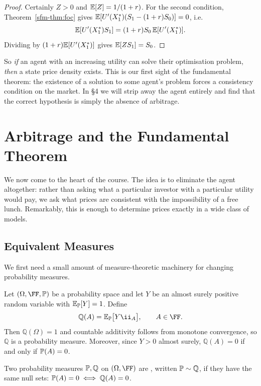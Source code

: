 \documentclass[a4paper]{scrartcl}
\newcommand{\QQ}{\mathbb{Q}}
\begin{document}
\begin{proof}
	Certainly $Z > 0$ and $\mathbb{E}[Z] = 1/(1+r)$. For the second condition, Theorem~\ref{sfm-thm:foc} gives $\mathbb{E}[U'(X_1^*)(S_1 - (1+r)S_0)] = 0$, i.e.
	$$
	\mathbb{E}[U'(X_1^*)S_1] = (1+r)S_0\,\mathbb{E}[U'(X_1^*)].
	$$
	Dividing by $(1+r)\mathbb{E}[U'(X_1^*)]$ gives $\mathbb{E}[ZS_1] = S_0$.
\end{proof}

So \emph{if} an agent with an increasing utility can solve their optimisation problem, \emph{then} a state price density exists. This is our first sight of the fundamental theorem: the existence of a solution to some agent's problem forces a consistency condition on the market. In \S4 we will strip away the agent entirely and find that the correct hypothesis is simply the absence of arbitrage.

\section{Arbitrage and the Fundamental Theorem}

We now come to the heart of the course. The idea is to eliminate the agent altogether: rather than asking what a particular investor with a particular utility would pay, we ask what prices are consistent with the impossibility of a free lunch. Remarkably, this is enough to determine prices exactly in a wide class of models.

\subsection{Equivalent Measures}

We first need a small amount of measure-theoretic machinery for changing probability measures.

Let $(\Omega, \FF, \PP)$ be a probability space and let $Y$ be an almost surely positive random variable with $\mathbb{E}_{\mathbb{P}}[Y] = 1$. Define
$$
\QQ(A) = \EE_\PP\big[Y \ii_A\big], \qquad A \in \FF.
$$
Then $\QQ(\Omega) = 1$ and countable additivity follows from monotone convergence, so $\QQ$ is a probability measure. Moreover, since $Y > 0$ almost surely, $\QQ(A) = 0$ if and only if $\mathbb{P}(A) = 0$.

\begin{definition}
	Two probability measures $\PP, \QQ$ on $(\Omega, \FF)$ are , written $\PP \sim \QQ$, if they have the same null sets: $\PP(A) = 0 \iff \QQ(A) = 0$.
\end{definition}
\end{document}
